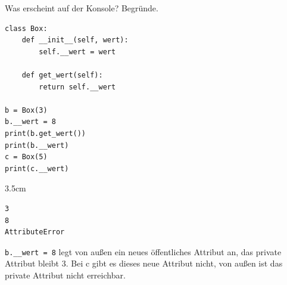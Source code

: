 \question[3]
Was erscheint auf der Konsole? Begründe.
\begin{lstlisting}
class Box:
    def __init__(self, wert):
        self.__wert = wert

    def get_wert(self):
        return self.__wert

b = Box(3)
b.__wert = 8
print(b.get_wert())
print(b.__wert)
c = Box(5)
print(c.__wert)
\end{lstlisting}
\begin{solutionbox}{3.5cm}
\begin{lstlisting}[language={}]
3
8
AttributeError
\end{lstlisting}
\texttt{b.\_\_wert = 8} legt von außen ein neues öffentliches Attribut an, das private Attribut bleibt 3.
Bei c gibt es dieses neue Attribut nicht, von außen ist das private Attribut nicht erreichbar.
\end{solutionbox}
